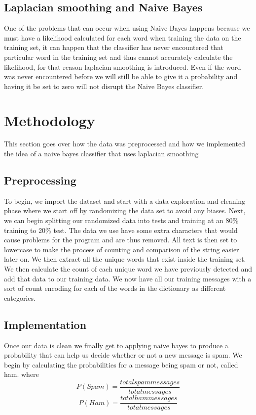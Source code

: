 \subsection{Laplacian smoothing and Naive Bayes}
One of the problems that can occur when using Naive Bayes happens because we must have a likelihood calculated for each word when training the data on the training set, it can happen that the classifier has never encountered that particular word in the training set and thus cannot accurately calculate the likelihood, for that reason laplacian smoothing is introduced. Even if the word was never encountered before we will still be able to give it a probability and having it be set to zero will not disrupt the Naive Bayes classifier.

\section{Methodology}
This section goes over how the data was preprocessed and how we implemented the idea of a naive bayes classifier that uses laplacian smoothing
\subsection{Preprocessing}
To begin, we import the dataset and start with a data exploration and cleaning phase where we start off by randomizing the data set to avoid any biases. Next, we can begin splitting our randomized data into tests and training at an 80\% training to 20\% test. The data we use have some extra characters that would cause problems for the program and are thus removed. All text is then set to lowercase to make the process of counting and comparison of the string easier later on.
We then extract all the unique words that exist inside the training set. We then calculate the count of each unique word we have previously detected and add that data to our training data. We now have all our training messages with a sort of count encoding for each of the words in the dictionary as different categories.


\subsection{Implementation}
Once our data is clean we finally get to applying naive bayes to produce a probability that can help us decide whether or not a new message is spam. We begin by calculating the probabilities for a message being spam or not, called ham. where 
\[ P(Spam) = \frac{total spam messages}{total messages} \]  
\[ P(Ham) = \frac{total ham messages}{total messages} \] 

